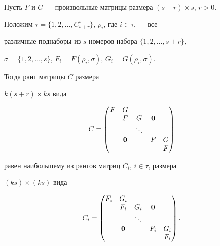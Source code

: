 \begin{lem} 


Пусть $F$ и $G$ --- произвольные матрицы размера $(s+r)\times s$, $r>0$. 


Положим $\tau=\{1,2,\dotsc,C^s_{s+r}\}$, $\rho_i$, где $i\in\tau$, --- все 


различные поднаборы из $s$ номеров набора $\{1,2,\dotsc,s+r\}$, 


$\sigma=\{1,2,\dotsc,s\}$, $F_i=F(\rho_i,\sigma)$, $G_i=G(\rho_i,\sigma)$. 


Тогда ранг матрицы $C$ размера 


$k(s+r)\times k s$ вида 


$$ 


C= 


\begin{pmatrix} 


F & G & \ & \ & \ \\ 


\ & F & G & \bold 0 & \ \\ 


\ & \ & \ddots & \ & \ \\ 


\ & \bold 0 & \ & F & G \\ 


\ & \ & \ & \ & F 


\end{pmatrix} 


$$ 


равен наибольшему из рангов матриц $C_i$, $i\in\tau$, размера 


$(ks)\times(ks)$ вида 


$$ 


C_i= 


\begin{pmatrix} 


F_i & G_i & \ & \ & \ \\ 


\ & F_i & G_i & \bold 0 & \ \\ 


\ & \ & \ddots & \ & \ \\ 


\ & \bold 0 & \ & F_i & G_i \\ 


\ & \ & \ & \ & F_i \\ 


\end{pmatrix}. 


$$ 


\end{lem} 


